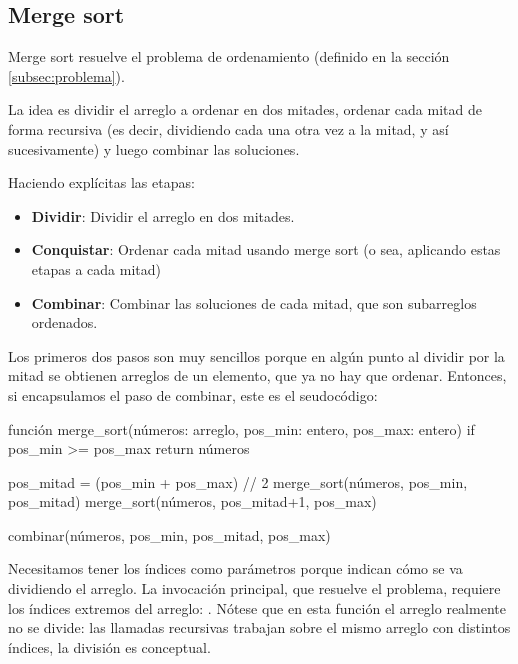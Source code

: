 \subsection{Merge sort}

Merge sort resuelve el problema de ordenamiento (definido en la sección \ref{subsec:problema}).

La idea es dividir el arreglo a ordenar en dos mitades, ordenar cada mitad de forma recursiva (es decir, dividiendo cada una otra vez a la mitad, y así sucesivamente) y luego combinar las soluciones.

Haciendo explícitas las etapas:
\begin{itemize}
    \item \textbf{Dividir}: Dividir el arreglo en dos mitades.
    \item \textbf{Conquistar}: Ordenar cada mitad usando merge sort (o sea, aplicando estas etapas a cada mitad)
    \item \textbf{Combinar}: Combinar las soluciones de cada mitad, que son subarreglos ordenados.
\end{itemize}

Los primeros dos pasos son muy sencillos porque en algún punto al dividir por la mitad se obtienen arreglos de un elemento, que ya no hay que ordenar. Entonces, si encapsulamos el paso de combinar, este es el seudocódigo:
\begin{pseudocode}
función merge_sort(números: arreglo, pos_min: entero, pos_max: entero)
    if pos_min >= pos_max
        return números

    pos_mitad = (pos_min + pos_max) // 2
    merge_sort(números, pos_min, pos_mitad)
    merge_sort(números, pos_mitad+1, pos_max)

    combinar(números, pos_min, pos_mitad, pos_max)
\end{pseudocode}
Necesitamos tener los índices como parámetros porque indican cómo se va dividiendo el arreglo. La invocación principal, que resuelve el problema, requiere los índices extremos del arreglo: . Nótese que en esta función el arreglo realmente no se divide: las llamadas recursivas trabajan sobre el mismo arreglo con distintos índices, la división es conceptual.

